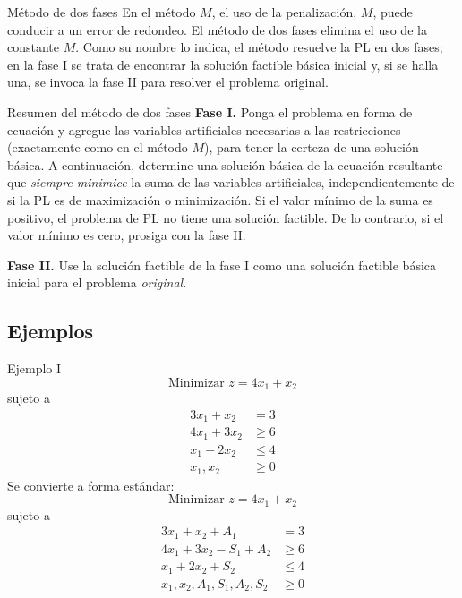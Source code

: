 \documentclass{beamer}
\begin{document}
\begin{frame}{Método de dos fases}
    En el método \( M \), el uso de la penalización, \( M \), puede conducir a un error de redondeo. El método de dos fases elimina el uso de la constante \( M \). Como su nombre lo indica, el método resuelve la PL en dos fases; en la fase I se trata de encontrar la solución factible básica inicial y, si se halla una, se invoca la fase II para resolver el problema original.

    \begin{block}{Resumen del método de dos fases}
        \textbf{Fase I.} Ponga el problema en forma de ecuación y agregue las variables artificiales necesarias a las restricciones (exactamente como en el método \( M \)), para tener la certeza de una solución básica. A continuación, determine una solución básica de la ecuación resultante que \emph{siempre minimice} la suma de las variables artificiales, independientemente de si la PL es de maximización o minimización. Si el valor mínimo de la suma es positivo, el problema de PL no tiene una solución factible. De lo contrario, si el valor mínimo es cero, prosiga con la fase II.

        \textbf{Fase II.} Use la solución factible de la fase I como una solución factible básica inicial para el problema \emph{original}.
    \end{block}
\end{frame}

\subsection{Ejemplos}
\begin{frame}{Ejemplo I}
    \[
    \text{Minimizar } z = 4x_1 + x_2
    \]
    sujeto a
    \[
    \begin{aligned}
    3x_1 + x_2 &= 3 \\
    4x_1 + 3x_2 &\geq 6 \\
    x_1 + 2x_2 &\leq 4 \\
    x_1, x_2 &\geq 0
    \end{aligned}
    \]
    Se convierte a forma estándar:
    \[
    \text{Minimizar } z = 4x_1 + x_2
    \]
    sujeto a
    \[
    \begin{aligned}
    3x_1 + x_2 + A_1&= 3 \\
    4x_1 + 3x_2 - S_1 + A_2&\geq 6 \\
    x_1 + 2x_2 +S_2 &\leq 4 \\
    x_1, x_2, A_1, S_1, A_2, S_2 &\geq 0
    \end{aligned}
    \]
    
\end{frame}
\end{document}

